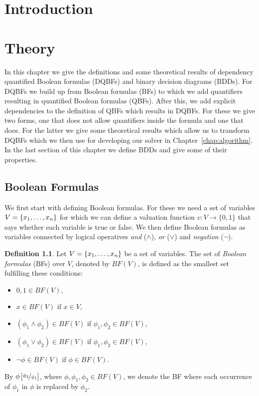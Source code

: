 \documentclass[
  digital, %
  twoside, %
  table,   %
  nolof,     %
  nolot,     %
]{fithesis3}
\let\setbuilder\set
\newcommand{\simpleset}[1]{\{{#1}\}}
\renewcommand{\set}[1]{\normalexpandarg\IfSubStr{#1}{|}{\setbuilder{#1}}{\simpleset{#1}}}
\theoremstyle{definition}
\newtheorem{definition}{Definition}
\theoremstyle{remark}
\newcommand{\substitute}[2]{\left[ \nicefrac{#2}{#1} \right]}
\newcommand{\BF}[1]{BF(#1)}
\begin{document}
\chapter*{Introduction}

\chapter{Theory}
In this chapter we give the definitions and some theoretical results of dependency quantified Boolean formulas (DQBFs) and binary decision diagrams (BDDs). For DQBFs we build up from Boolean formulas (BFs) to which we add quantifiers resulting in quantified Boolean formulas (QBFs). After this, we add explicit dependencies to the definition of QBFs which results in DQBFs. For these we give two forms, one that does not allow quantifiers inside the formula and one that does. For the latter we give some theoretical results which allow us to transform DQBFs which we then use for developing our solver in Chapter~\ref{chap:algorithm}. In the last section of this chapter we define BDDs and give some of their properties.%


\section{Boolean Formulas}

We first start with defining Boolean formulas. For these we need a set of variables $V = \set{x_1, \dots, x_n}$ for which we can define a valuation function $v\colon V \to \{0,1\}$ that says whether each variable is true or false. We then define Boolean formulas as variables connected by logical operatives \emph{and} (${\land}$), \emph{or} (${\lor}$) and \emph{negation} (${\neg}$).

\begin{definition}
Let $V = \set{x_1, \dots, x_n}$ be a set of variables. The set of \emph{Boolean formulas} (BFs) over $V$, denoted by $\BF{V}$, is defined as the smallest set fulfilling these conditions:
\begin{itemize}
    \item $0,1 \in \BF{V}$,
    \item $x \in \BF{V}$ if $x \in V$,
    \item $(\phi_1 \land \phi_2) \in \BF{V}$ if $\phi_1, \phi_2 \in \BF{V}$,
    \item $(\phi_1 \lor \phi_2) \in \BF{V}$ if $\phi_1, \phi_2 \in \BF{V}$,
    \item $\neg\phi \in \BF{V}$ if $\phi \in \BF{V}$.
\end{itemize}
\end{definition}
By $\phi\substitute{\phi_1}{\phi_2}$, where $\phi,\phi_1,\phi_2 \in \BF{V}$, we denote the BF where each occurrence of $\phi_1$ in $\phi$ is replaced by $\phi_2$.
\end{document}
